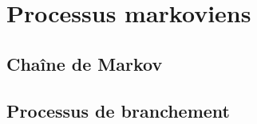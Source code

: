 \section{Processus markoviens} 
\newcommand{\probas}{/home/robin/ENSEIGN/Cours/MathBiologie/L3-ENS-Math1/Exercices/Probas}

\subsection{Chaîne de Markov}



\subsection{Processus de branchement}




